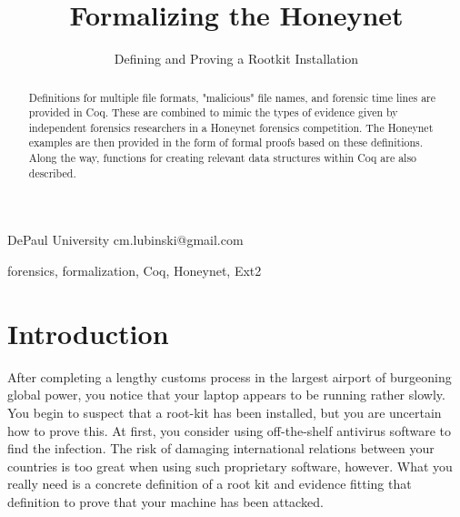 \documentclass[nocopyrightspace]{sigplanconf}
\begin{document}
\lstset{language=coq, basicstyle=\ttfamily\scriptsize, columns=flexible,
keepspaces=true}

\setlength{\pdfpageheight}{\paperheight}
\setlength{\pdfpagewidth}{\paperwidth}



\title{Formalizing the Honeynet}
\subtitle{Defining and Proving a Rootkit Installation}

           {DePaul University}
           {cm.lubinski@gmail.com}

\maketitle

\begin{abstract}
Definitions for multiple file formats, "malicious" file names, and forensic
time lines are provided in Coq. These are combined to mimic the types of
evidence given by independent forensics researchers in a Honeynet forensics
competition. The Honeynet examples are then provided in the form of formal
proofs based on these definitions. Along the way, functions for creating
relevant data structures within Coq are also described.
\end{abstract}

\keywords
forensics, formalization, Coq, Honeynet, Ext2

\section{Introduction}

After completing a lengthy customs process in the largest airport of
burgeoning global power, you notice that your laptop appears to be running
rather slowly. You begin to suspect that a root-kit has been installed, but
you are uncertain how to prove this. At first, you consider using
off-the-shelf antivirus software to find the infection. The risk of damaging
international relations between your countries is too great when using such
proprietary software, however. What you really need is a concrete definition
of a root kit and evidence fitting that definition to prove that your machine
has been attacked.
\end{document}

